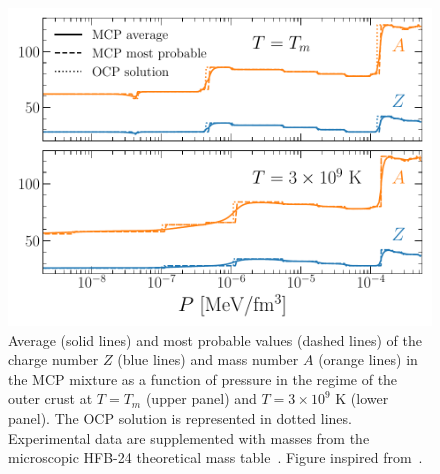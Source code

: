 \begin{figure}[!t]
  \begin{center}
    \includegraphics[width=0.9\linewidth]{figures/compo_mcp_ocrust.pdf}
  \end{center}
  \caption[Equilibrium composition of the multicomponent plasma versus pressure
  in the outer crust regime]{
    Average (solid lines) and most probable values (dashed lines) of the charge 
    number $Z$ (blue lines) and mass number $A$ (orange lines) in the MCP 
    mixture as a function of pressure in the regime of the outer crust at 
    $T=T_m$ (upper panel) and $T=3\times 10^9$ K (lower panel). 
    The OCP solution is represented in dotted lines.
    Experimental data are supplemented with masses from the microscopic 
    HFB-24 theoretical mass table~\cite{Goriely2013}. 
  Figure inspired from~\cite{Fantina2020}.}\label{fig:compo_mcp_ocrust}
\end{figure}

